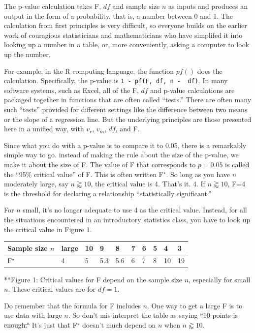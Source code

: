 \documentclass[]{book}
\begin{document}
The p-value calculation takes F, \(df\) and sample size \(n\) as inputs and produces an output in the form of a probability, that is, a number between 0 and 1. The calculation from first principles is very difficult, so everyone builds on the earlier work of couragious statisticians and mathematicians who have simplifed it into looking up a number in a table, or, more conveniently, asking a computer to look up the number.

For example, in the R computing language, the function \(pf()\) does the calculation. Specifically, the p-value is \texttt{1\ -\ pf(F,\ df,\ n\ -\ \ df)}. In many software systems, such as Excel, all of the F, \(df\) and p-value calculations are packaged together in functions that are often called ``tests.'' There are often many such ``tests'' provided for different settings like the difference between two means or the slope of a regression line. But the underlying principles are those presented here in a unified way, with \(v_r\), \(v_m\), \(df\), and F.

Since what you do with a p-value is to compare it to 0.05, there is a remarkably simple way to go. instead of making the rule about the size of the p-value, we make it about the size of F. The value of F that corresponds to \(p = 0.05\) is called the ``95\% critical value'' of F. This is often written F\(^\star\). So long as you have \(n\) moderately large, say \(n \gtrapprox 10\), the critical value is 4. That's it. 4. If \(n \gtrapprox 10\), F=4 is the threshold for declaring a relationship ``statistically significant.''

For \(n\) small, it's no longer adequate to use 4 as the critical value. Instead, for all the situations encountered in an introductory statistics class, you have to look up the critical value in Figure 1.

\begin{longtable}[]{@{}llllllllll@{}}
\toprule
Sample size \(n\) & large & 10 & 9 & 8 & 7 & 6 & 5 & 4 & 3\tabularnewline
\midrule
\endhead
F\(^\star\) & 4 & 5 & 5.3 & 5.6 & 6 & 7 & 8 & 10 & 19\tabularnewline
\bottomrule
\end{longtable}

**Figure 1: Critical values for F depend on the sample size \(n\), especially for small \(n\). These critical values are for \(df=1\).

Do remember that the formula for F includes \(n\). One way to get a large F is to use data with large \(n\). So don't mis-interpret the table as saying \sout{``10 points is enough.''} It's just that F\(^\star\) doesn't much depend on \(n\) when \(n \gtrapprox 10\).
\end{document}
